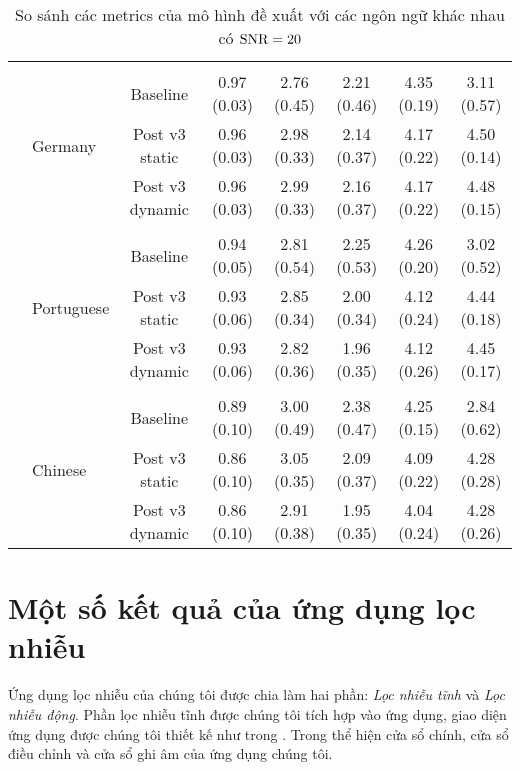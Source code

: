\begin{sidewaystable}
\begin{subtable}{\textwidth}
\begin{tabular}{llcccccc}
					&&&&&&&\\
					& \multirow{3}{*}{Germany}      &Baseline       & 0.97 (0.03)   & 2.76 (0.45)   & 2.21 (0.46)   & 4.35 (0.19)   & 3.11 (0.57) \\
					&               &Post v3 static & 0.96 (0.03)   & 2.98 (0.33)   & 2.14 (0.37)   & 4.17 (0.22)   & 4.50 (0.14) \\
					&               &Post v3 dynamic        & 0.96 (0.03)   & 2.99 (0.33)   & 2.16 (0.37)   & 4.17 (0.22)   & 4.48 (0.15) \\
					&&&&&&&\\
					& \multirow{3}{*}{Portuguese}   &Baseline       & 0.94 (0.05)   & 2.81 (0.54)   & 2.25 (0.53)   & 4.26 (0.20)   & 3.02 (0.52) \\
					&               &Post v3 static & 0.93 (0.06)   & 2.85 (0.34)   & 2.00 (0.34)   & 4.12 (0.24)   & 4.44 (0.18) \\
					&               &Post v3 dynamic        & 0.93 (0.06)   & 2.82 (0.36)   & 1.96 (0.35)   & 4.12 (0.26)   & 4.45 (0.17) \\
					&&&&&&&\\
					& \multirow{3}{*}{Chinese}      &Baseline       & 0.89 (0.10)   & 3.00 (0.49)   & 2.38 (0.47)   & 4.25 (0.15)   & 2.84 (0.62) \\
					&               &Post v3 static & 0.86 (0.10)   & 3.05 (0.35)   & 2.09 (0.37)   & 4.09 (0.22)   & 4.28 (0.28) \\
					&               &Post v3 dynamic        & 0.86 (0.10)   & 2.91 (0.38)   & 1.95 (0.35)   & 4.04 (0.24)   & 4.28 (0.26) \\
					\hline
				\end{tabular}
				\caption{So sánh các metrics của mô hình đề xuất với các ngôn ngữ khác nhau có $\text{SNR}=20$}
			\end{subtable}
		\end{sidewaystable}
	
	\clearpage

\section{Một số kết quả của ứng dụng lọc nhiễu}\label{section::results::app}

	Ứng dụng lọc nhiễu của chúng tôi được chia làm hai phần: \textit{Lọc nhiễu tĩnh} và \textit{Lọc nhiễu động}. Phần lọc nhiễu tĩnh được chúng tôi tích hợp vào ứng dụng, giao diện ứng dụng được chúng tôi thiết kế như trong . Trong  thể hiện cửa sổ chính, cửa sổ điều chỉnh và cửa sổ ghi âm của ứng dụng chúng tôi.
	
